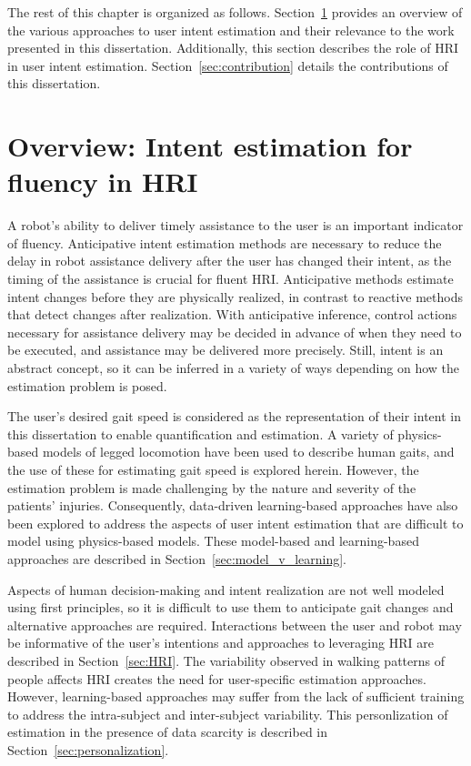 The rest of this chapter is organized as follows. Section~\ref{sec:overview} provides an overview of the various approaches to user intent estimation and their relevance to the work presented in this dissertation. Additionally, this section describes the role of HRI in user intent estimation. Section~\ref{sec:contribution} details the contributions of this dissertation.

\section{Overview: Intent estimation for fluency in HRI} \label{sec:overview}

A robot's ability to deliver timely assistance to the user is an important indicator of fluency. Anticipative intent estimation methods are necessary to reduce the delay in robot assistance delivery after the user has changed their intent, as the timing of the assistance is crucial for fluent HRI. Anticipative methods estimate intent changes before they are physically realized, in contrast to reactive methods that detect changes after realization. With anticipative inference, control actions necessary for assistance delivery may be decided in advance of when they need to be executed, and assistance may be delivered more precisely. Still, intent is an abstract concept, so it can be inferred in a variety of ways depending on how the estimation problem is posed. 

The user's desired gait speed is considered as the representation of their intent in this dissertation to enable quantification and estimation. A variety of physics-based models of legged locomotion have been used to describe human gaits, and the use of these for estimating gait speed is explored herein. However, the estimation problem is made challenging by the nature and severity of the patients' injuries. Consequently, data-driven learning-based approaches have also been explored to address the aspects of user intent estimation that are difficult to model using physics-based models. These model-based and learning-based approaches are described in Section~\ref{sec:model_v_learning}. 

Aspects of human decision-making and intent realization are not well modeled using first principles, so it is difficult to use them to anticipate gait changes and alternative approaches are required. Interactions between the user and robot may be informative of the user's intentions and approaches to leveraging HRI are described in Section~\ref{sec:HRI}. The variability observed in walking patterns of people affects HRI creates the need for user-specific estimation approaches. However, learning-based approaches may suffer from the lack of sufficient training to address the intra-subject and inter-subject variability. This personlization of estimation in the presence of data scarcity is described in Section~\ref{sec:personalization}.

